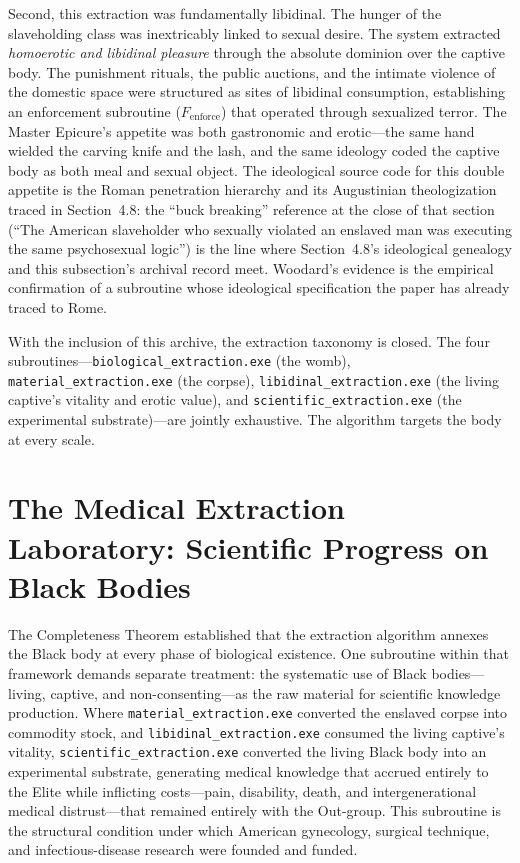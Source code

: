 Second, this extraction was fundamentally libidinal. The hunger of the slaveholding class was inextricably linked to sexual desire. The system extracted \textit{homoerotic and libidinal pleasure} through the absolute dominion over the captive body. The punishment rituals, the public auctions, and the intimate violence of the domestic space were structured as sites of libidinal consumption, establishing an enforcement subroutine ($F_{\text{enforce}}$) that operated through sexualized terror. The Master Epicure's appetite was both gastronomic and erotic---the same hand wielded the carving knife and the lash, and the same ideology coded the captive body as both meal and sexual object. The ideological source code for this double appetite is the Roman penetration hierarchy and its Augustinian theologization traced in Section~4.8: the ``buck breaking'' reference at the close of that section (``The American slaveholder who sexually violated an enslaved man was executing the same psychosexual logic'') is the line where Section~4.8's ideological genealogy and this subsection's archival record meet. Woodard's evidence is the empirical confirmation of a subroutine whose ideological specification the paper has already traced to Rome.

With the inclusion of this archive, the extraction taxonomy is closed. The four subroutines---\texttt{biological\_extraction.exe} (the womb), \texttt{material\_extraction.exe} (the corpse), \texttt{libidinal\_extraction.exe} (the living captive's vitality and erotic value), and \texttt{scientific\_extraction.exe} (the experimental substrate)---are jointly exhaustive. The algorithm targets the body at every scale.

\section{The Medical Extraction Laboratory: Scientific Progress on Black Bodies}
\label{sec:medical_extraction}

The Completeness Theorem established that the extraction algorithm annexes the Black body at every phase of biological existence. One subroutine within that framework demands separate treatment: the systematic use of Black bodies---living, captive, and non-consenting---as the raw material for scientific knowledge production. Where \texttt{material\_extraction.exe} converted the enslaved corpse into commodity stock, and \texttt{libidinal\_extraction.exe} consumed the living captive's vitality, \texttt{scientific\_extraction.exe} converted the living Black body into an experimental substrate, generating medical knowledge that accrued entirely to the Elite while inflicting costs---pain, disability, death, and intergenerational medical distrust---that remained entirely with the Out-group. This subroutine is the structural condition under which American gynecology, surgical technique, and infectious-disease research were founded and funded.

